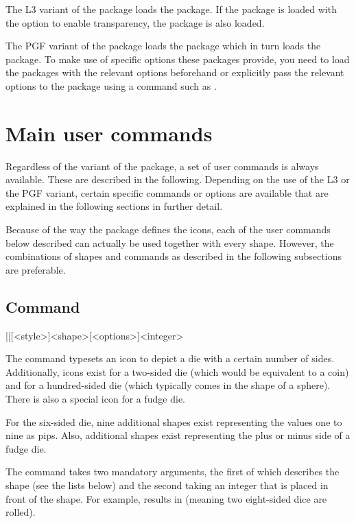 \documentclass[a4paper]{article}
\begin{document}
The L3 variant of the package loads the  package. If the package is loaded with the  option to enable transparency, the  package is also loaded.

The PGF variant of the package loads the  package which in turn loads the  package. To make use of specific options these packages provide, you need to load the packages with the relevant options beforehand or explicitly pass the relevant options to the package using a command such as .

\section{Main user commands}

Regardless of the variant of the package, a set of user commands is always available. These are described in the following. Depending on the use of the L3 or the PGF variant, certain specific commands or options are available that are explained in the following sections in further detail.

Because of the way the package defines the icons, each of the user commands below described can actually be used together with every shape. However, the combinations of shapes and commands as described in the following subsections are preferable.

\subsection[Command \textbackslash die]{Command }

\begin{macrodef}
|\die|[<style>]{<shape>}[<options>]{<integer>}
\end{macrodef}
The command \macro{\die} typesets an icon to depict a die with a certain number of sides. Additionally, icons exist for a two-sided die (which would be equivalent to a coin) and for a hundred-sided die (which typically comes in the shape of a sphere). There is also a special icon for a fudge die.

For the six-sided die, nine additional shapes exist representing the values one to nine as pips. Also, additional shapes exist representing the plus or minus side of a fudge die.

The command takes two mandatory arguments, the first of which describes the shape (see the lists below) and the second taking an integer that is placed in front of the shape. For example,  results in  (meaning two eight-sided dice are rolled).
\end{document}
